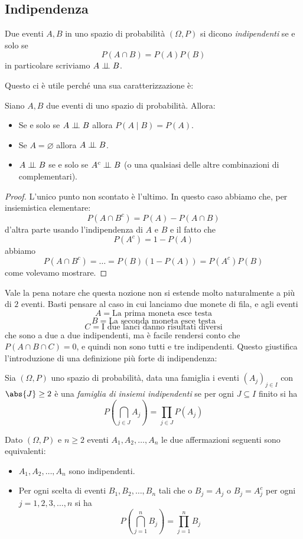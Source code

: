 \documentclass[11pt]{scrartcl}
\newcommand{\eset}{\varnothing}
\begin{document}
	\subsection{Indipendenza}
	\begin{definition}
		Due eventi $A,B$ in uno spazio di probabilità $(\Omega,P)$ si dicono \textit{indipendenti} se e solo se
		$$P(A\cap B)=P(A)P(B)$$
		in particolare scriviamo $A\indep B$.
	\end{definition}
	Questo ci è utile perché una sua caratterizzazione è:
	\begin{lemma}
		Siano $A,B$ due eventi di uno spazio di probabilità. Allora:
		\begin{itemize}
			\item Se e solo se $A\indep B$ allora $P(A\mid B)=P(A)$.
			\item Se $A=\eset$ allora $A\indep B$.
			\item $A\indep B$ se e solo se $A^c\indep B$ (o una qualsiasi delle altre combinazioni di complementari).
		\end{itemize}
	\end{lemma}
	\begin{proof}
		L'unico punto non scontato è l'ultimo. In questo caso abbiamo che, per insiemistica elementare:
		$$P(A\cap B^c)=P(A)-P(A\cap B)$$
		d'altra parte usando l'indipendenza di $A$ e $B$ e il fatto che 
		$$P(A^c)=1-P(A)$$
		abbiamo
		$$P(A\cap B^c)=\dots = P(B)(1-P(A))=P(A^c)P(B)$$
		come volevamo mostrare.
	\end{proof}
	Vale la pena notare che questa nozione non si estende molto naturalmente a più di $2$ eventi. Basti pensare al caso in cui lanciamo due monete di fila, e agli eventi
	$$A=\text{La prima moneta esce testa}$$
	$$B=\text{La seconda moneta esce testa}$$
	$$C=\text{I due lanci danno risultati diversi}$$
	che sono a due a due indipendenti, ma è facile rendersi conto che $P(A\cap B \cap C)=0$, e quindi non sono tutti e tre indipendenti. Questo giustifica l'introduzione di una definizione più forte di indipendenza:
	\begin{definition}
		Sia $(\Omega,P)$ uno spazio di probabilità, data una famiglia i eventi $\left(A_j\right)_{j\in I}$ con $\abs{J}\ge 2$ è una \textit{famiglia di insiemi indipendenti} se per ogni $J\subseteq I$ finito si ha
		$$P\left(\bigcap_{j\in J}A_j\right)=\prod_{j\in J}P(A_j)$$
	\end{definition}
	\begin{proposition}
		Dato $(\Omega,P)$ e $n\ge 2$ eventi $A_1,A_2,\dots,A_n$ le due affermazioni seguenti sono equivalenti:
		\begin{itemize}
			\item[(1)] $A_1,A_2,\dots,A_n$ sono indipendenti.
			\item[(2)] Per ogni scelta di eventi $B_1,B_2,\dots,B_n$ tali che o $B_j=A_j$ o $B_j=A_j^c$ per ogni $j=1,2,3,\dots,n$ si ha
			$$P\left(\bigcap_{j=1}^n B_j\right)=\prod_{j=1}^n B_j$$ 
		\end{itemize}
	\end{proposition}
\end{document}

